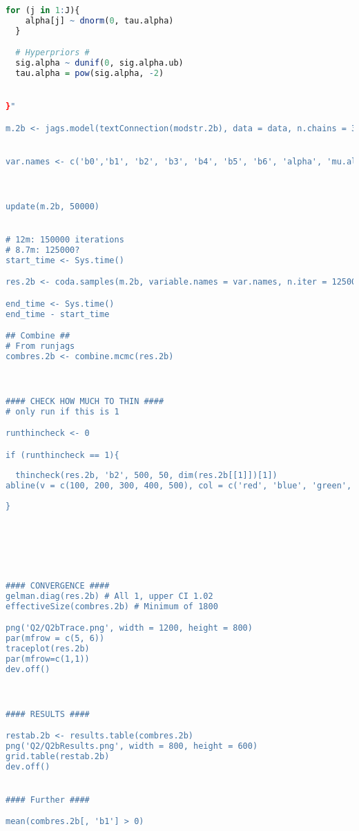\documentclass[11pt]{article}
\begin{document}
\begin{lstlisting}[language=R]
  for (j in 1:J){
    alpha[j] ~ dnorm(0, tau.alpha)
  }

  # Hyperpriors #
  sig.alpha ~ dunif(0, sig.alpha.ub)
  tau.alpha = pow(sig.alpha, -2)


}"

m.2b <- jags.model(textConnection(modstr.2b), data = data, n.chains = 3)


var.names <- c('b0','b1', 'b2', 'b3', 'b4', 'b5', 'b6', 'alpha', 'mu.alpha', 'sig.alpha')



update(m.2b, 50000)


# 12m: 150000 iterations
# 8.7m: 125000?
start_time <- Sys.time()

res.2b <- coda.samples(m.2b, variable.names = var.names, n.iter = 125000, thin = 100)

end_time <- Sys.time()
end_time - start_time

## Combine ##
# From runjags
combres.2b <- combine.mcmc(res.2b)



#### CHECK HOW MUCH TO THIN ####
# only run if this is 1

runthincheck <- 0

if (runthincheck == 1){
  
  thincheck(res.2b, 'b2', 500, 50, dim(res.2b[[1]])[1])
abline(v = c(100, 200, 300, 400, 500), col = c('red', 'blue', 'green', 'purple', 'pink'))
  
} 






#### CONVERGENCE ####
gelman.diag(res.2b) # All 1, upper CI 1.02
effectiveSize(combres.2b) # Minimum of 1800

png('Q2/Q2bTrace.png', width = 1200, height = 800)
par(mfrow = c(5, 6))
traceplot(res.2b)
par(mfrow=c(1,1))
dev.off()



#### RESULTS ####

restab.2b <- results.table(combres.2b)
png('Q2/Q2bResults.png', width = 800, height = 600)
grid.table(restab.2b)
dev.off()


#### Further ####

mean(combres.2b[, 'b1'] > 0) 

\end{lstlisting}

\newpage
\end{document}
